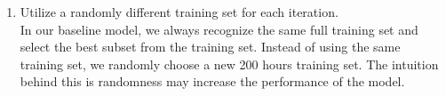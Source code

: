 \begin{enumerate}



\item Utilize a randomly different training set for each iteration. \\
In our baseline model, we always recognize the same full training set and select the best subset from the training set. Instead of using the same training set, we randomly choose a new 200 hours training set. The intuition behind this is randomness may increase the performance of the model.

\end{enumerate}



